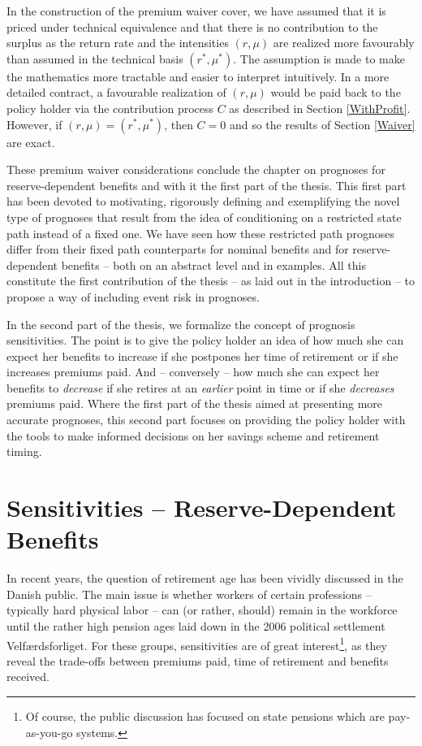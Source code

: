 \documentclass{article}
\newcommand{\1}[1]{\mathbbm{1}_{\left\lbrace #1 \right\rbrace}}
\theoremstyle{break}
\theoremstyle{remark}
\newenvironment{remark}
  {\pushQED{\qed}\renewcommand{\qedsymbol}{\scalebox{1.4}{$\circ$}}\remarkx}
  {\popQED\endremarkx}
\numberwithin{equation}{section}
\begin{document}
\begin{remark}
	In the construction of the premium waiver cover, we have assumed that it is priced under technical equivalence and that there is no contribution to the surplus as the return rate and the intensities $(r,\mu)$ are realized more favourably than assumed in the technical basis $(r^*,\mu^*)$. The assumption is made to make the mathematics more tractable and easier to interpret intuitively. In a more detailed contract, a favourable realization of $(r,\mu)$ would be paid back to the policy holder via the contribution process $C$ as described in Section \ref{WithProfit}. However, if $(r,\mu)=(r^*,\mu^*)$, then $C=0$ and so the results of Section \ref{Waiver} are exact.
\end{remark}

\bigskip
\bigskip
\bigskip

These premium waiver considerations conclude the chapter on prognoses for reserve-dependent benefits and with it the first part of the thesis. This first part has been devoted to motivating, rigorously defining and exemplifying the novel type of prognoses that result from the idea of conditioning on a restricted state path instead of a fixed one. We have seen how these restricted path prognoses differ from their fixed path counterparts for nominal benefits and for reserve-dependent benefits -- both on an abstract level and in examples. All this constitute the first contribution of the thesis -- as laid out in the introduction -- to propose a way of including event risk in prognoses.

In the second part of the thesis, we formalize the concept of prognosis sensitivities. The point is to give the policy holder an idea of how much she can expect her benefits to increase if she postpones her time of retirement or if she increases premiums paid. And -- conversely -- how much she can expect her benefits to \textit{decrease} if she retires at an \textit{earlier} point in time or if she \textit{decreases} premiums paid. Where the first part of the thesis aimed at presenting more accurate prognoses, this second part focuses on providing the policy holder with the tools to make informed decisions on her savings scheme and retirement timing.

\newpage
\section{Sensitivities -- Reserve-Dependent Benefits}

In recent years, the question of retirement age has been vividly discussed in the Danish public. The main issue is whether workers of certain professions -- typically hard physical labor -- can (or rather, should) remain in the workforce until the rather high pension ages laid down in the 2006 political settlement Velfærdsforliget. For these groups, sensitivities are of great interest\footnote{Of course, the public discussion has focused on state pensions which are pay-as-you-go systems.}, as they reveal the trade-offs between premiums paid, time of retirement and benefits received.
\end{document}
